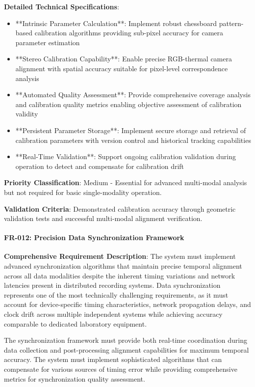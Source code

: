\documentclass[12pt,a4paper]{article}
\begin{document}
\textbf{Detailed Technical Specifications}:

\begin{itemize}
\item **Intrinsic Parameter Calculation**: Implement robust chessboard pattern-based calibration algorithms providing
  sub-pixel accuracy for camera parameter estimation
\item **Stereo Calibration Capability**: Enable precise RGB-thermal camera alignment with spatial accuracy suitable for
  pixel-level correspondence analysis
\item **Automated Quality Assessment**: Provide comprehensive coverage analysis and calibration quality metrics enabling
  objective assessment of calibration validity
\item **Persistent Parameter Storage**: Implement secure storage and retrieval of calibration parameters with version
  control and historical tracking capabilities
\item **Real-Time Validation**: Support ongoing calibration validation during operation to detect and compensate for
  calibration drift

\end{itemize}
\textbf{Priority Classification}: Medium - Essential for advanced multi-modal analysis but not required for basic
single-modality operation.

\textbf{Validation Criteria}: Demonstrated calibration accuracy through geometric validation tests and successful multi-modal
alignment verification.

\paragraph{FR-012: Precision Data Synchronization Framework}

\textbf{Comprehensive Requirement Description}: The system must implement advanced synchronization algorithms that maintain
precise temporal alignment across all data modalities despite the inherent timing variations and network latencies
present in distributed recording systems. Data synchronization represents one of the most technically challenging
requirements, as it must account for device-specific timing characteristics, network propagation delays, and clock drift
across multiple independent systems while achieving accuracy comparable to dedicated laboratory equipment.

The synchronization framework must provide both real-time coordination during data collection and post-processing
alignment capabilities for maximum temporal accuracy. The system must implement sophisticated algorithms that can
compensate for various sources of timing error while providing comprehensive metrics for synchronization quality
assessment.
\end{document}
